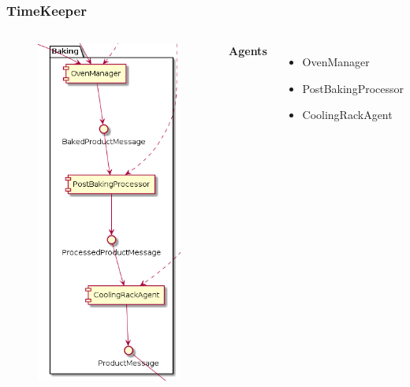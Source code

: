 \documentclass{beamer}
\begin{document}
\begin{frame}
    \frametitle{\huge{TimeKeeper}}
    \begin{columns}[t]
        \begin{figure}[H]
            \centering
            \includegraphics[width=0.6\linewidth]{baking_component_diagram.png}
        \end{figure}
            \textbf{Agents}
            \begin{itemize}
                \item OvenManager
                \item PostBakingProcessor
                \item CoolingRackAgent
            \end{itemize}
    \end{columns}
\end{frame}
\end{document}
